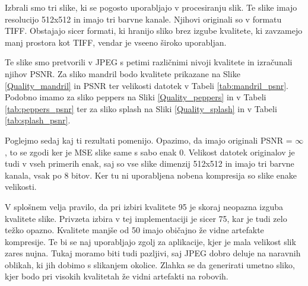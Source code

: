 \documentclass[a4paper,12pt,openright]{book}
\begin{document}
Izbrali smo tri slike, ki se pogosto uporabljajo v procesiranju slik. Te slike imajo resolucijo 512x512 in imajo tri barvne kanale. Njihovi originali so v formatu TIFF. Obstajajo sicer formati, ki hranijo sliko brez izgube kvalitete, ki zavzamejo manj prostora kot TIFF, vendar je vseeno široko uporabljan.

Te slike smo pretvorili v JPEG s petimi različnimi nivoji kvalitete in izračunali njihov PSNR. Za sliko mandril bodo kvalitete prikazane na Slike \ref{Quality_mandril} in PSNR ter velikosti datotek v Tabeli \ref{tab:mandril_psnr}. Podobno imamo za sliko peppers na Sliki \ref{Quality_peppers} in v Tabeli \ref{tab:peppers_psnr} ter za sliko splash na Sliki \ref{Quality_splash} in v Tabeli \ref{tab:splash_psnr}. \par
Poglejmo sedaj kaj ti rezultati pomenijo. Opazimo, da imajo originali PSNR = $\infty$, to se zgodi ker je MSE slike same s sabo enak 0. Velikost datotek originalov je tudi v vseh primerih enak, saj so vse slike dimenzij 512x512 in imajo tri barvne kanala, vsak po 8 bitov. Ker tu ni uporabljena nobena kompresija so slike enake velikosti.\par
V splošnem velja pravilo, da pri izbiri kvalitete 95 je skoraj neopazna izguba kvalitete slike. Privzeta izbira v tej implementaciji je sicer 75, kar je tudi zelo težko opazno. Kvalitete manjše od 50 imajo običajno že vidne artefakte kompresije. Te bi se naj uporabljajo zgolj za aplikacije, kjer je mala velikost slik zares nujna. Tukaj moramo biti tudi pazljivi, saj JPEG dobro deluje na naravnih oblikah, ki jih dobimo s slikanjem okolice. Zlahka se da generirati umetno sliko, kjer bodo pri visokih kvalitetah že vidni artefakti na robovih.\par
\end{document}
